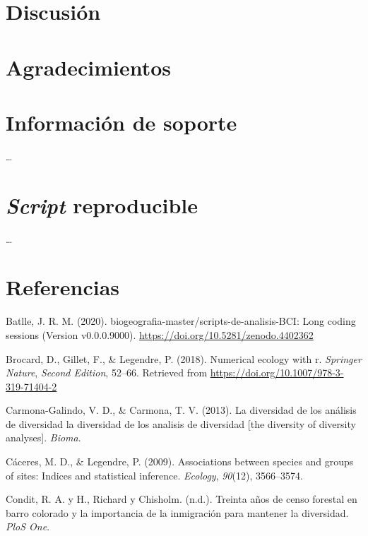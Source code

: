 \documentclass[11pt,]{article}
\begin{document}
\section{Discusión}\label{discusiuxf3n}

\section{Agradecimientos}\label{agradecimientos}

\section{Información de soporte}\label{informaciuxf3n-de-soporte}

\ldots

\section{\texorpdfstring{\emph{Script}
reproducible}{Script reproducible}}\label{script-reproducible}

\ldots

\section*{Referencias}\label{referencias}

\hypertarget{refs}{}
\hypertarget{ref-jose_ramon_martinez_batlle_2020_4402362}{}
Batlle, J. R. M. (2020). biogeografia-master/scripts-de-analisis-BCI:
Long coding sessions (Version v0.0.0.9000).
\url{https://doi.org/10.5281/zenodo.4402362}

\hypertarget{ref-brocard2011numerical}{}
Brocard, D., Gillet, F., \& Legendre, P. (2018). Numerical ecology with
r. \emph{Springer Nature}, \emph{Second Edition}, 52--66. Retrieved from
\url{https://doi.org/10.1007/978-3-319-71404-2}

\hypertarget{ref-carmona2013diversidad}{}
Carmona-Galindo, V. D., \& Carmona, T. V. (2013). La diversidad de los
análisis de diversidad la diversidad de los analisis de diversidad
{[}the diversity of diversity analyses{]}. \emph{Bioma}.

\hypertarget{ref-caceres2009associations}{}
Cáceres, M. D., \& Legendre, P. (2009). Associations between species and
groups of sites: Indices and statistical inference. \emph{Ecology},
\emph{90}(12), 3566--3574.

\hypertarget{ref-condit2012thirty}{}
Condit, R. A. y H., Richard y Chisholm. (n.d.). Treinta años de censo
forestal en barro colorado y la importancia de la inmigración para
mantener la diversidad. \emph{PloS One}.
\end{document}

